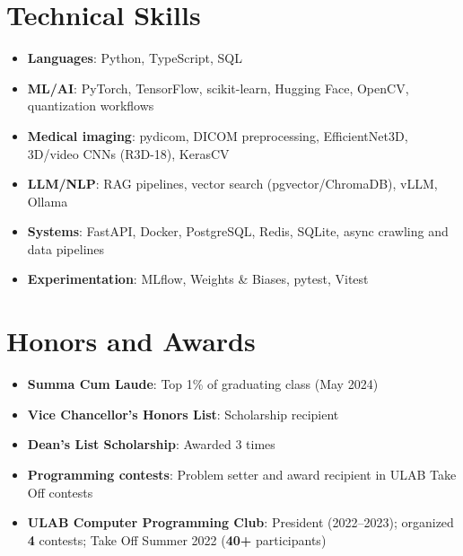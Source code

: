 \documentclass[a4paper,11pt]{article}
\newcommand{\cvItem}[2]{
  \item\small{
    \textbf{#1}{: #2 \vspace{-2pt}}
  }
}
\newcommand{\cvSubItem}[2]{\cvItem{#1}{#2}\vspace{-3pt}}
\newcommand{\cvListStart}{\begin{itemize}[leftmargin=*]}
\newcommand{\cvListEnd}{\end{itemize}}
\begin{document}

\section{Technical Skills}
\cvListStart
\cvSubItem{Languages}{Python, TypeScript, SQL}
\cvSubItem{ML/AI}{PyTorch, TensorFlow, scikit-learn, Hugging Face, OpenCV, quantization workflows}
\cvSubItem{Medical imaging}{pydicom, DICOM preprocessing, EfficientNet3D, 3D/video CNNs (R3D-18), KerasCV}
\cvSubItem{LLM/NLP}{RAG pipelines, vector search (pgvector/ChromaDB), vLLM, Ollama}
\cvSubItem{Systems}{FastAPI, Docker, PostgreSQL, Redis, SQLite, async crawling and data pipelines}
\cvSubItem{Experimentation}{MLflow, Weights \& Biases, pytest, Vitest}
\cvListEnd

\section{Honors and Awards}
\cvListStart
\cvItem{Summa Cum Laude}{Top 1\% of graduating class (May 2024)}
\cvItem{Vice Chancellor's Honors List}{Scholarship recipient}
\cvItem{Dean's List Scholarship}{Awarded 3 times}
\cvItem{Programming contests}{Problem setter and award recipient in ULAB Take Off contests}
\cvItem{ULAB Computer Programming Club}{President (2022--2023); organized \textbf{4} contests; Take Off Summer 2022 (\textbf{40+} participants)}
\cvListEnd
\end{document}
